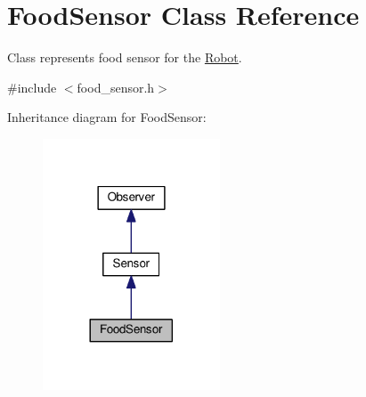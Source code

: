\hypertarget{classFoodSensor}{}\section{Food\+Sensor Class Reference}
\label{classFoodSensor}


Class represents food sensor for the \hyperlink{classRobot}{Robot}.  




{\ttfamily \#include $<$food\+\_\+sensor.\+h$>$}



Inheritance diagram for Food\+Sensor\+:\nopagebreak
\begin{figure}[H]
\begin{center}
\leavevmode
\includegraphics[width=149pt]{classFoodSensor__inherit__graph}
\end{center}
\end{figure}


